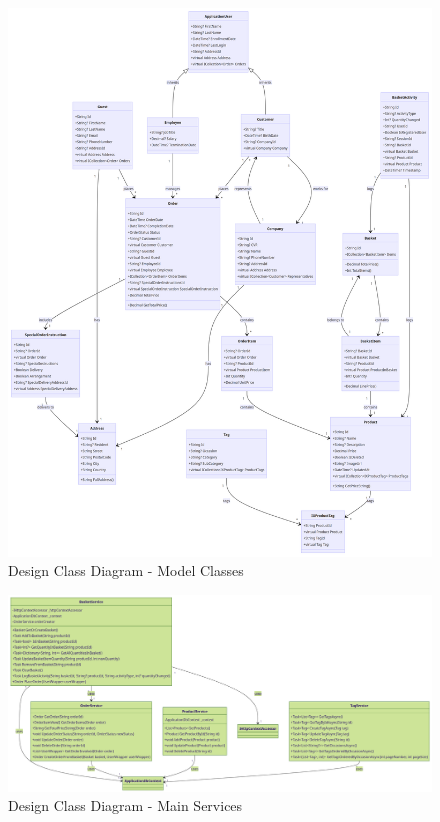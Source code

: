 \begin{figure}
    \centering
    \includegraphics[width=1\textwidth]{figures/diagrams/dcd-modelclasses.png}
    \caption{Design Class Diagram - Model Classes}
    \label{fig:class-diagram-models}
\end{figure}

\begin{figure}
    \centering
    \includegraphics[width=1\textwidth]{figures/diagrams/dcd-main-services.png}
    \caption{Design Class Diagram - Main Services}
    \label{fig:class-diagram-main-services}
\end{figure}

